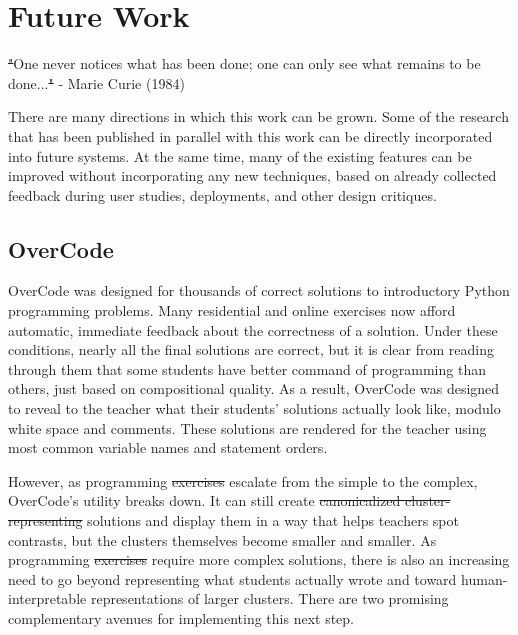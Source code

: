 \documentclass[12pt,twoside]{mitthesis}
\providecommand{\DIFaddtex}[1]{{\protect\color{blue}\uwave{#1}}} %
\providecommand{\DIFdeltex}[1]{{\protect\color{red}\sout{#1}}}                      %
\providecommand{\DIFaddbegin}{} %
\providecommand{\DIFaddend}{} %
\providecommand{\DIFdelbegin}{} %
\providecommand{\DIFdelend}{} %
\providecommand{\DIFadd}[1]{\texorpdfstring{\DIFaddtex{#1}}{#1}} %
\providecommand{\DIFdel}[1]{\texorpdfstring{\DIFdeltex{#1}}{}} %
\begin{document}
\section{Future Work}
\DIFdelbegin \DIFdel{"}\DIFdelend \DIFaddbegin \DIFadd{``}\DIFaddend One never notices what has been done; one can only see what remains to be done...\DIFdelbegin \DIFdel{" }\DIFdelend \DIFaddbegin \DIFadd{'' }\DIFaddend - Marie Curie (1984)

There are many directions in which this work can be grown. Some of the research that has been published in parallel with this work can be directly incorporated into future systems. At the same time, many of the existing features can be improved without incorporating any new techniques, based on already collected feedback during user studies, deployments, and other design critiques.

\subsection{OverCode}

OverCode was designed for thousands of correct solutions to introductory Python programming problems. Many residential and online exercises now afford automatic, immediate feedback about the correctness of a solution. Under these conditions, nearly all the final solutions are correct, but it is clear from reading through them that some students have better command of programming than others, just based on compositional quality. As a result, OverCode was designed to reveal to the teacher what their students' solutions actually look like, modulo white space and comments. These solutions are rendered for the teacher using most common variable names and statement orders.%

However, as programming \DIFdelbegin \DIFdel{exercises }\DIFdelend \DIFaddbegin \DIFadd{problems }\DIFaddend escalate from the simple to the complex, OverCode's utility breaks down. It can still create \DIFdelbegin \DIFdel{canonicalized cluster-representing }\DIFdelend \DIFaddbegin \DIFadd{platonic }\DIFaddend solutions and display them in a way that helps teachers spot contrasts, but the clusters themselves become smaller and smaller. As programming \DIFdelbegin \DIFdel{exercises }\DIFdelend \DIFaddbegin \DIFadd{problems }\DIFaddend require more complex solutions, there is also an increasing need to go beyond representing what students actually wrote and toward human-interpretable representations of larger clusters. There are two promising complementary avenues for implementing this next step.
\end{document}
